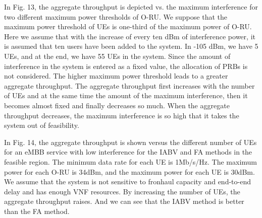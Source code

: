 \documentclass[lettersize,journal]{IEEEtran}
\begin{document}

In Fig. 13, the aggregate throughput is depicted vs. the maximum interference for two different maximum power thresholds of O-RU. We suppose that the maximum power threshold of UEs is one-third of the maximum power of O-RU.
Here we assume that with the increase of every ten dBm of interference power, it is assumed that ten users have been added to the system. In -105 dBm, we have 5 UEs, and at the end, we have 55 UEs in the system.
Since the amount of interference in the system is entered as a fixed value,
the allocation of PRBs is not considered.
The higher maximum power threshold leads to a greater aggregate throughput.
The aggregate throughput first increases with the number of UEs and at the same time the amount of the maximum interference, then it becomes almost fixed and finally decreases so much. When the aggregate throughput decreases, the maximum interference is so high that it takes the system out of feasibility.


In Fig. 14, the aggregate throughput is shown versus
the different number of UEs for an eMBB service with low interference for the IABV and FA methods in the feasible region.
The minimum data rate for each UE is 1Mb/s/Hz.
The maximum power for each O-RU is 34dBm, and the maximum power for each UE is 30dBm. We assume that the system is not sensitive to fronhaul capacity and end-to-end delay and has enough VNF resources.
By increasing the number of UEs, the aggregate throughput raises.
And we can see that the IABV method is better than the FA method.
\end{document}
